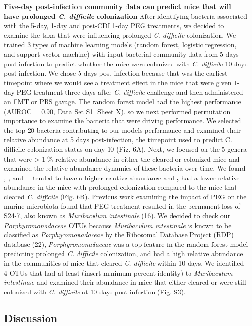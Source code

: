 \documentclass[
  11pt,
]{article}
\begin{document}
\textbf{Five-day post-infection community data can predict mice that
will have prolonged \emph{C. difficile} colonization} After identifying
bacteria associated with the 5-day, 1-day and post-CDI 1-day PEG
treatments, we decided to examine the taxa that were influencing
prolonged \emph{C. difficile} colonization. We trained 3 types of
machine learning models (random forest, logistic regression, and support
vector machine) with input bacterial community data from 5 days
post-infection to predict whether the mice were colonized with \emph{C.
difficile} 10 days post-infection. We chose 5 days post-infection
because that was the earliest timepoint where we would see a treatment
effect in the mice that were given 1-day PEG treatment three days after
\emph{C. difficile} challenge and then administered an FMT or PBS
gavage. The random forest model had the highest performance (AUROC =
0.90, Data Set S1, Sheet X), so we next performed permutation importance
to examine the bacteria that were driving performance. We selected the
top 20 bacteria contributing to our models performance and examined
their relative abundance at 5 days post-infection, the timepoint used to
predict C. difficile colonization status on day 10 (Fig. 6A). Next, we
focused on the 5 genera that were \textgreater{} 1 \% relative abundance
in either the cleared or colonized mice and examined the relative
abundance dynamics of these bacteria over time. We found \emph{, }, and
\_ tended to have a higher relative abundance and \textbf{, } had a
lower relative abundance in the mice with prolonged colonization
compared to the mice that cleared \emph{C. difficile} (Fig. 6B).
Previous work examining the impact of PEG on the murine microbiota found
that PEG treatment resulted in the permanent loss of S24-7, also known
as \emph{Muribaculum intestinale} (16). We decided to check our
\emph{Porphyromonadaceae} OTUs because \emph{Muribaculum intestinale} is
known to be classified as \emph{Porphyromonadaceae} by the Ribosomal
Database Project (RDP) database (22), \emph{Porphyromonadaceae} was a
top feature in the random forest model predicting prolonged \emph{C.
difficile} colonization, and had a high relative abundance in the
communities of mice that cleared \emph{C. difficile} within 10 days. We
identified 4 OTUs that had at least (insert minimum percent identity) to
\emph{Muribaculum intestinale} and examined their abundance in mice that
either cleared or were still colonized with \emph{C. difficile} at 10
days post-infection (Fig. S3).

\hypertarget{discussion}{%
\subsection{Discussion}\label{discussion}}
\end{document}

